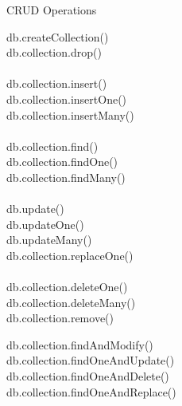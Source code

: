 \documentclass{beamer}
\begin{document}
\begin{frame}{CRUD Operations}
	\begin{minipage}[t]{0.48\textwidth}
		\scriptsize
		\begin{Alms*}
			db.createCollection() \\
			db.collection.drop() \\
			\\
			db.collection.insert() \\
			db.collection.insertOne() \\
			db.collection.insertMany() \\
			\\
			db.collection.find() \\
			db.collection.findOne() \\
			db.collection.findMany() \\
			\\
			db.update()  \\
			db.updateOne() \\
			db.updateMany() \\
			db.collection.replaceOne() \\
			\\
			db.collection.deleteOne() \\
			db.collection.deleteMany() \\
			db.collection.remove()
			
		\end{Alms*}
	\end{minipage}
	\hfill
	\begin{minipage}[t]{0.48\textwidth}
		\scriptsize
		\begin{Alms*}
			db.collection.findAndModify() \\
			db.collection.findOneAndUpdate() \\
			db.collection.findOneAndDelete() \\
			db.collection.findOneAndReplace() \\
		\end{Alms*}
	\end{minipage}
\end{frame}
\end{document}
